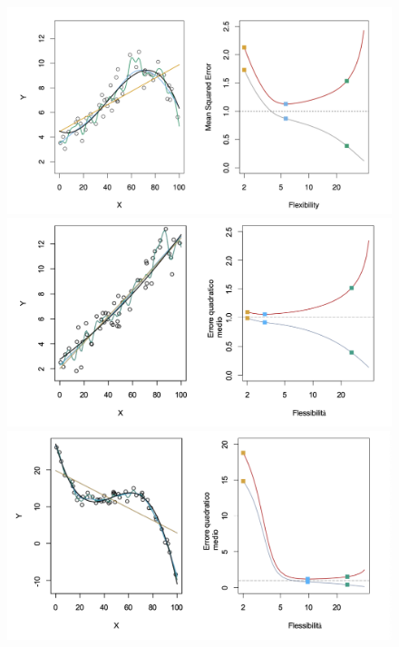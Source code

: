 \begin{figure}
    \centering
    \begin{minipage}[b]{0.7\textwidth}
        \includegraphics[width=\textwidth]{./figures/intro/flexibilityexample1.png}
    \end{minipage}
    \begin{minipage}[b]{0.7\textwidth}
        \includegraphics[width=\textwidth]{./figures/intro/flexibilityexample2.png}
    \end{minipage}
    \begin{minipage}[b]{0.7\textwidth}
        \includegraphics[width=\textwidth]{./figures/intro/flexibilityexample3.png}

\end{minipage}
\end{figure}
